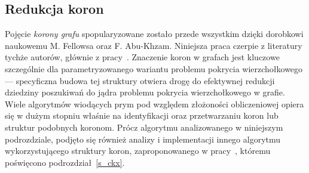 \subsection{Redukcja koron}
\label{ss_kernelization_crown_reduction}
\par{
  Pojęcie \emph{korony grafu} spopularyzowane zostało przede wszystkim dzięki dorobkowi naukowemu M. Fellowsa oraz F. Abu-Khzam.
  Niniejsza praca czerpie z literatury tychże autorów, głównie z pracy~\cite{KernelizationAlgorithms04}.
  Znaczenie koron w grafach jest kluczowe szczególnie dla parametryzowanego wariantu problemu pokrycia wierzchołkowego --- specyficzna budowa tej struktury otwiera drogę do efektywnej redukcji dziedziny poszukiwań do jądra problemu pokrycia wierzchołkowego w grafie.
  Wiele algorytmów wiodących prym pod względem złożoności obliczeniowej opiera się w dużym stopniu właśnie na identyfikacji oraz przetwarzaniu koron lub struktur podobnych koronom.
  Prócz algorytmu analizowanego w niniejszym podrozdziale, podjęto się również analizy i implementacji innego algorytmu wykorzystującego struktury koron, zaproponowanego w pracy~\cite{ImprovedBounds10}, któremu poświęcono podrozdział~\ref{s_ckx}.
}
